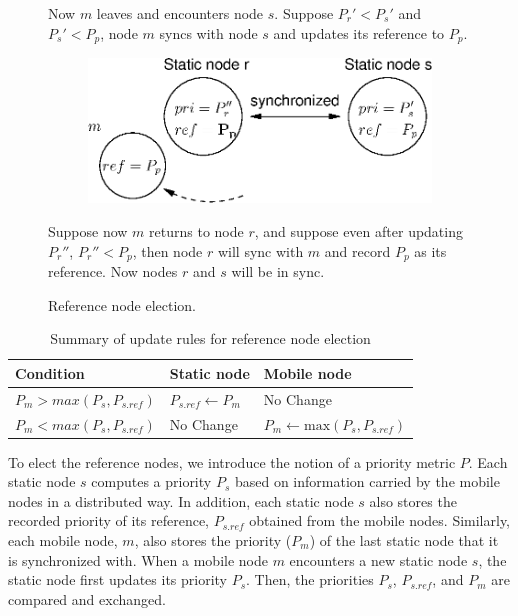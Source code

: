 \documentclass[twoside,twocolumn]{article}
\begin{document}
\begin{figure}[t]
{      Now $m$ leaves and encounters node $s$. Suppose $P_r'<P_s'$
      and $P_s'<P_p$, node $m$ syncs with node $s$ and updates its
      reference to $P_p$.\\}
  \begin{subfigure}
      \centering
      \includegraphics[scale=0.35]{figs/illustration-4}
  \end{subfigure}
      \parbox{.8\columnwidth}
      {\smallskip\scriptsize
      Suppose now $m$ returns to node $r$, and suppose even after
      updating $P_r''$, $P_r''<P_p$, then node $r$ will sync with $m$
      and record $P_p$ as its reference. Now nodes $r$ and $s$ will be
      in sync.\\}
  \caption{Reference node election.} 
  \label{fig:selection}
\end{figure}

\begin{table}[t]\scriptsize
   \centering
   \caption{Summary of update rules for reference node election}
   \begin{tabularx}{\columnwidth}{@{}lll@{}}
     \toprule
     Condition & Static node & Mobile node \\
     \midrule
       $P_{m} > max(P_{s}, P_{s.ref})$ & $P_{s.ref} \leftarrow P_m$ & No Change \\
       $P_{m}<max(P_{s}, P_{s.ref})$ & No Change & $P_m \leftarrow \textrm{max}(P_s, P_{s.ref})$ \\
     \bottomrule
   \end{tabularx}
   \label{tab:priority}
\end{table}

To elect the reference nodes, we introduce the notion of a priority
metric $P$.  Each static node $s$ computes a priority $P_s$ based on
information carried by the mobile nodes in a distributed way. In
addition, each static node $s$ also stores the recorded priority of
its reference, $P_{s.ref}$ obtained from the mobile nodes. Similarly,
each mobile node, $m$, also stores the priority ($P_m$) of the last
static node that it is synchronized with. When a mobile node $m$
encounters a new static node $s$, the static node first updates its
priority $P_s$. Then, the priorities $P_s$, $P_{s.ref}$, and $P_m$ are
compared and exchanged.
\end{document}
